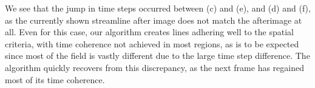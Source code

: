 We see that the jump in time steps occurred between  (c) and (e), and (d) and (f),
as the currently shown streamline after image does not match the afterimage at all.
Even for this case, our algorithm creates lines adhering well to the spatial criteria,
with time coherence not achieved in most regions, as is to be expected since most of the field is vastly
different due to the large time step difference.
The algorithm quickly recovers from this discrepancy,
as the next frame has regained most of its time coherence.
